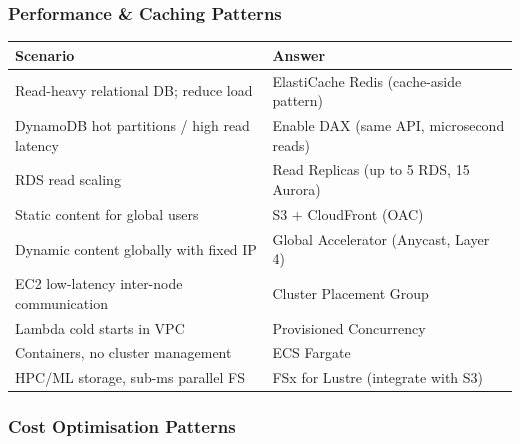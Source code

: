 \subsubsection{Performance \& Caching Patterns}

\begin{comparebox}[title={Performance and caching}]
\begin{tabular}{@{}p{6cm}p{5.5cm}@{}}
\toprule
\textbf{Scenario} & \textbf{Answer} \\
\midrule
Read-heavy relational DB; reduce load          & ElastiCache Redis (cache-aside pattern) \\[3pt]
DynamoDB hot partitions / high read latency    & Enable DAX (same API, microsecond reads) \\[3pt]
RDS read scaling                               & Read Replicas (up to 5 RDS, 15 Aurora) \\[3pt]
Static content for global users                & S3 + CloudFront (OAC) \\[3pt]
Dynamic content globally with fixed IP         & Global Accelerator (Anycast, Layer 4) \\[3pt]
EC2 low-latency inter-node communication       & Cluster Placement Group \\[3pt]
Lambda cold starts in VPC                      & Provisioned Concurrency \\[3pt]
Containers, no cluster management              & ECS Fargate \\[3pt]
HPC/ML storage, sub-ms parallel FS             & FSx for Lustre (integrate with S3) \\[3pt]
\bottomrule
\end{tabular}
\end{comparebox}

\subsubsection{Cost Optimisation Patterns}

